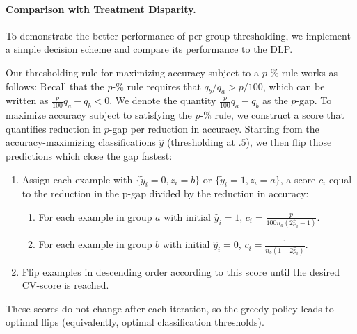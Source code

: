 \paragraph{Comparison with Treatment Disparity.}
To demonstrate the better performance 
of per-group thresholding, 
we implement a simple decision scheme
and compare its performance to the DLP.


Our thresholding rule
for maximizing accuracy 
subject to a $p$-$\%$ rule works as follows:
Recall that the $p$-$\%$ rule requires 
that $q_b/q_a > p/100$, which can be written as
$\frac{p}{100} q_a - q_b < 0$.
We denote the quantity $\frac{p}{100} q_a - q_b$ as the $p$-gap.
To maximize accuracy subject to satisfying the $p$-$\%$ rule,
we construct a score
that quantifies reduction in $p$-gap 
per reduction in accuracy.
Starting from the accuracy-maximizing classifications $\hat y$
(thresholding at $.5$),
we then flip those predictions 
which close the gap fastest:



\begin{enumerate}
\item Assign each example with $\lbrace \tilde{y}_i =0, z_i=b\rbrace$ or $\lbrace\tilde{y}_i = 1, z_i=a \rbrace$,
a score $c_i$ 
equal to the reduction in the p-gap 
divided by the reduction in accuracy:
\begin{enumerate}
\item For each example in group $a$ with initial $\hat{y}_i=1$,
$c_i = \frac{p}{100n_a(2\hat{p}_i-1)}$.
\item For each example in group $b$ with initial $\hat{y}_i=0$,
$c_i = \frac{1}{n_b(1-2\hat{p}_i)}$.\\[-0.5\baselineskip]
\end{enumerate}
\item Flip examples in descending order 
according to this score 
until the desired CV-score is reached.
\end{enumerate}
These scores do not change after each iteration, so the greedy policy leads to optimal flips (equivalently, optimal classification thresholds).


